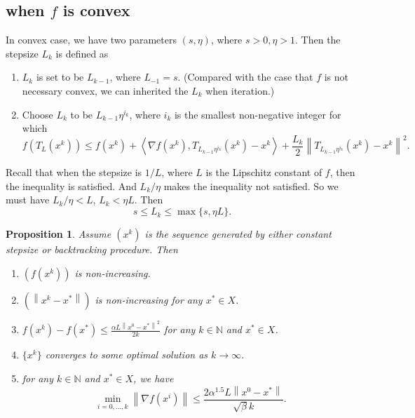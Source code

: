 \documentclass[12pt,a4paper]{report}
\numberwithin{equation}{section}
\theoremstyle{mystyle}
\newtheorem{proposition}[definition]{Proposition}
\newcommand{\N}{\mathbb{N}}
\newcommand{\grad}{\nabla}
\newcommand{\norm}[1]{\left\lVert #1 \right\rVert}
\newcommand{\inner}[1]{\left\langle #1 \right\rangle}
\begin{document}
	\subsection{when $f$ is convex}
	In convex case, we have two parameters $(s,\eta)$, where $s>0,\eta>1$. Then the stepsize $L_k$ is defined as
	\begin{enumerate}
		\item $L_k$ is set to be $L_{k-1}$, where $L_{-1}=s$. (Compared with the case that $f$ is not necessary convex, we can inherited the $L_k$ when iteration.)
		\item Choose $L_k$ to be $L_{k-1}\eta^{i_k}$, where $i_k$ is the smallest non-negative integer for which
		$$
		f(T_L(x^k))\leq f(x^k)+\inner{\grad f(x^k),T_{L_{k-1}\eta^{i_k}}(x^k) - x^k }+\frac{L_k}{2}\norm{T_{L_{k-1}\eta^{i_k}}(x^k) - x^k}^2.
		$$
	\end{enumerate}
	Recall that when the stepsize is $1/L$, where $L$ is the Lipschitz constant of $f$, then the inequality is satisfied. And $L_k/
	\eta$ makes the inequality not satisfied. So we must have $L_k/\eta<L$, $L_k<\eta L$. Then
	$$
	s\leq L_k \leq \max\{s,\eta L\}.
	$$
	\begin{proposition}
		Assume $(x^k)$ is the sequence generated by either constant stepsize or backtracking procedure. Then
		\begin{enumerate}
			\item $(f(x^k))$ is non-increasing.
			\item $(\norm{x^k-x^*})$ is non-increasing for any $x^*\in X$.
			\item $f(x^k)-f(x^*)\leq \frac{\alpha L\norm{x^0-x^*}^2}{2k}$ for any $k\in \N$ and $x^*\in X$.
			\item $\{x^k\}$ converges to some optimal solution as $k\to\infty$.
			\item for any $k\in \N$ and $x^*\in X$, we have
			$$
			\min_{i=0,\dots,k}\norm{\grad f(x^i)}\leq \frac{2\alpha^{1.5}L\norm{x^0-x^*}}{\sqrt{\beta}k}.
			$$
		\end{enumerate}
	\end{proposition}
\end{document}
